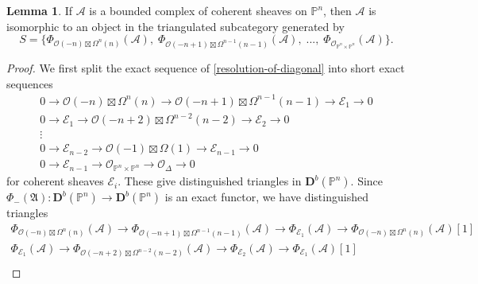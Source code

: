 \documentclass[a4paper]{article}
\theoremstyle{definition}
\newtheorem{lemma}[defn]{Lemma}
\theoremstyle{remark}
\newcommand{\deri}{\mathbf{D}}
\newcommand{\Pn}{\ensuremath{{\mathbb{P}^n}}}
\begin{document}
\begin{lemma} \label{generatorlemma1}
    If \(\mathscr{A}\) is a bounded complex of coherent sheaves on \(\Pn\), then
    \(\mathscr{A}\) is isomorphic to an object in the triangulated subcategory
    generated by 
    \[S=\{\Phi_{\mathscr{O}(-n)\boxtimes \Omega^n(n)}(\mathscr{A}),\;
    \Phi_{\mathscr{O}(-n+1)\boxtimes \Omega^{n-1}(n-1)}(\mathscr{A}),\;...,\;
    \Phi_{\mathscr{O}_{\Pn\times \Pn}}(\mathscr{A})\}.\] 
    \begin{proof} 
        We first split the exact sequence of \cref{resolution-of-diagonal} into
        short exact sequences 
        \begin{gather*} 
            0\rightarrow \mathscr{O}(-n)\boxtimes \Omega^n(n)  \longrightarrow
            \mathscr{O}(-n+1)\boxtimes \Omega^{n-1}(n-1) \longrightarrow
            \mathscr{E}_1 \rightarrow 0 \\ 
            0\rightarrow \mathscr{E}_1 \longrightarrow
            \mathscr{O}(-n+2)\boxtimes \Omega^{n-2}(n-2) \longrightarrow
            \mathscr{E}_2 \rightarrow 0 \\ 
            \vdots \\ 
            0\rightarrow \mathscr{E}_{n-2} \longrightarrow
            \mathscr{O}(-1)\boxtimes \Omega(1) \longrightarrow \mathscr{E}_{n-1}
            \rightarrow 0  \\ 
            0\rightarrow \mathscr{E}_{n-1} \longrightarrow
            \mathscr{O}_{\Pn\times \Pn}\longrightarrow \mathscr{O}_\Delta
            \rightarrow 0  
        \end{gather*} 
        for coherent sheaves \(\mathscr{E}_i\). These give distinguished
        triangles in \(\deri^b(\Pn)\). Since
        \(\Phi_{-}(\mathfrak{A}):\deri^b(\Pn)\rightarrow \deri^b(\Pn)\) is an
        exact functor, we have distinguished triangles 
        \begin{gather*} 
            \Phi_{\mathscr{O}(-n)\boxtimes \Omega^n(n)}(\mathscr{A})  \longrightarrow
            \Phi_{\mathscr{O}(-n+1)\boxtimes \Omega^{n-1}(n-1)}(\mathscr{A}) \longrightarrow
            \Phi_{\mathscr{E}_1}(\mathscr{A}) \longrightarrow
            \Phi_{\mathscr{O}(-n)\boxtimes \Omega^n(n)}(\mathscr{A})
            [1] \\ 
            \Phi_{\mathscr{E}_1}(\mathscr{A}) \longrightarrow
            \Phi_{\mathscr{O}(-n+2)\boxtimes \Omega^{n-2}(n-2)}(\mathscr{A})
            \longrightarrow \Phi_{\mathscr{E}_2}(\mathscr{A}) \longrightarrow
            \Phi_{\mathscr{E}_1}(\mathscr{A})[1] \\ 

\end{gather*}
\end{proof}
\end{lemma}
\end{document}
